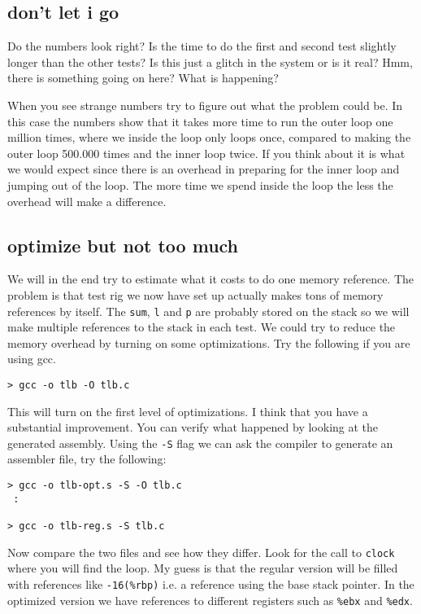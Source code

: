 \documentclass[a4paper,11pt]{article}
\begin{document}
\subsection{don't let i go}

Do the numbers look right? Is the time to do the first and second test
slightly longer than the other tests? Is this just a glitch in the
system or is it real? Hmm, there is something going on here? What is
happening?

When you see strange numbers try to figure out what the problem could
be. In this case the numbers show that it takes more time to run the
outer loop one million times, where we inside the loop only loops
once, compared to making the outer loop 500.000 times and the inner
loop twice. If you think about it is what we would expect since there
is an overhead in preparing for the inner loop and jumping out of the
loop. The more time we spend inside the loop the less the overhead
will make a difference.

\subsection{optimize but not too much}

We will in the end try to estimate what it costs to do one memory
reference. The problem is that test rig we now have set up actually
makes tons of memory references by itself. The {\tt sum}, {\tt l} and
{\tt p} are probably stored on the stack so we will make multiple
references to the stack in each test. We could try to reduce the
memory overhead by turning on some optimizations. Try the following if
you are using gcc.

\begin{verbatim}
> gcc -o tlb -O tlb.c
\end{verbatim}

This will turn on the first level of optimizations. I think that you
have a substantial improvement. You can verify what happened by
looking at the generated assembly. Using the {\tt -S} flag we can ask
the compiler to generate an assembler file, try the following:

\begin{verbatim}
> gcc -o tlb-opt.s -S -O tlb.c
 :

> gcc -o tlb-reg.s -S tlb.c
\end{verbatim}

Now compare the two files and see how they differ. Look for the call
to {\tt clock} where you will find the loop. My guess is that the
regular version will be filled with references like {\tt -16(\%rbp)}
i.e. a reference using the base stack pointer. In the optimized
version we have references to different registers such as {\tt \%ebx}
and {\tt \%edx}.
\end{document}
